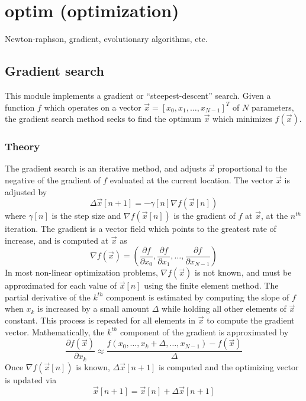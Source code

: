 % 
%

\newpage
\section{optim (optimization)}
\label{module:optim}
Newton-raphson, gradient, evolutionary algorithms, etc.

\subsection{Gradient search}
\label{module:optim:gradient_search}
This module implements a gradient or ``steepest-descent'' search.
Given a function $f$ which operates on a vector
$\vec{x} = [x_0,x_1,\ldots,x_{N-1}]^T$ of $N$ parameters,
the gradient search method seeks to find the optimum $\vec{x}$ which
minimizes $f(\vec{x})$.

\subsubsection{Theory}
The gradient search is an iterative method, and adjusts $\vec{x}$ proportional
to the negative of the gradient of $f$ evaluated at the current location.
The vector $\vec{x}$ is adjusted by
\[
    \Delta \vec{x}[n+1] = -\gamma[n] \nabla f(\vec{x}[n])
\]
where $\gamma[n]$ is the step size and
$\nabla f(\vec{x}[n])$ is the gradient of $f$ at $\vec{x}$, at the $n^{th}$
iteration.
The gradient is a vector field which points to the greatest rate of increase,
and is computed at $\vec{x}$ as
\[
    \nabla f(\vec{x}) = \left(
        \frac{\partial f}{\partial x_0},
        \frac{\partial f}{\partial x_1},
        \ldots,
        \frac{\partial f}{\partial x_{N-1}}
    \right)
\]
In most non-linear optimization problems, $\nabla f(\vec{x})$ is not known,
and must be approximated for each value of $\vec{x}[n]$ using the finite element
method.
The partial derivative of the $k^{th}$ component is estimated by computing the
slope of $f$ when $x_k$ is increased by a small amount $\Delta$ while holding
all other elements of $\vec{x}$ constant.
This process is repeated for all elements in $\vec{x}$ to compute the gradient
vector.
Mathematically, the $k^{th}$ component of the gradient is approximated by
\[
    \frac{\partial f(\vec{x})}{\partial x_k} \approx 
    \frac{f(x_0,\ldots,x_k+\Delta,\ldots,x_{N-1}) - f(\vec{x})}{\Delta}
\]
Once $\nabla f(\vec{x}[n])$ is known, $\Delta\vec{x}[n+1]$ is computed and the
optimizing vector is updated via
\[
    \vec{x}[n+1] = \vec{x}[n] + \Delta\vec{x}[n+1]
\]

